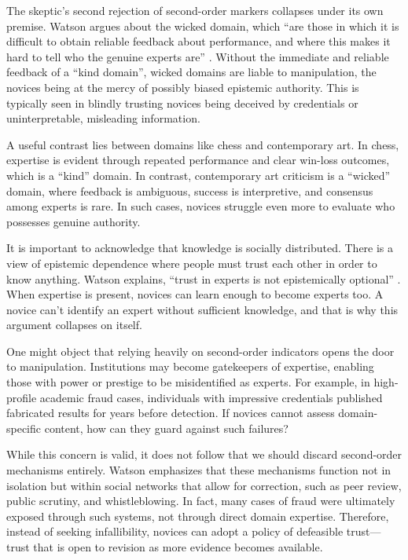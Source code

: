 The skeptic’s second rejection of second-order markers collapses under its own premise. Watson argues about the wicked domain, which “are those in which it is difficult to obtain reliable feedback about performance, and where this makes it hard to tell who the genuine experts are” \autocite[p.\ 210]{watson2022fixing}. Without the immediate and reliable feedback of a “kind domain”, wicked domains are liable to manipulation, the novices being at the mercy of possibly biased epistemic authority. This is typically seen in blindly trusting novices being deceived by credentials or uninterpretable, misleading information.

A useful contrast lies between domains like chess and contemporary art. In chess, expertise is evident through repeated performance and clear win-loss outcomes, which is a “kind” domain. In contrast, contemporary art criticism is a “wicked” domain, where feedback is ambiguous, success is interpretive, and consensus among experts is rare. In such cases, novices struggle even more to evaluate who possesses genuine authority.

It is important to acknowledge that knowledge is socially distributed. There is a view of epistemic dependence where people must trust each other in order to know anything. Watson explains, “trust in experts is not epistemically optional” \autocite[p.\ 139]{watson2022fixing}. When expertise is present, novices can learn enough to become experts too. A novice can't identify an expert without sufficient knowledge, and that is why this argument collapses on itself.

One might object that relying heavily on second-order indicators opens the door to manipulation. Institutions may become gatekeepers of expertise, enabling those with power or prestige to be misidentified as experts. For example, in high-profile academic fraud cases, individuals with impressive credentials published fabricated results for years before detection. If novices cannot assess domain-specific content, how can they guard against such failures?

While this concern is valid, it does not follow that we should discard second-order mechanisms entirely. Watson emphasizes that these mechanisms function not in isolation but within social networks that allow for correction, such as peer review, public scrutiny, and whistleblowing. In fact, many cases of fraud were ultimately exposed through such systems, not through direct domain expertise. Therefore, instead of seeking infallibility, novices can adopt a policy of defeasible trust—trust that is open to revision as more evidence becomes available.

